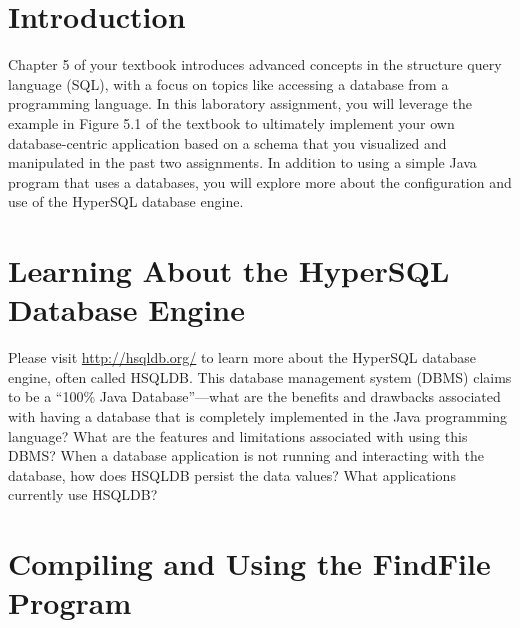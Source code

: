 


\usepackage[compact]{titlesec}



\section*{Introduction}

Chapter 5 of your textbook introduces advanced concepts in the structure query language (SQL), with a focus on topics
like accessing a database from a programming language. In this laboratory assignment, you will leverage the example in
Figure 5.1 of the textbook to ultimately implement your own database-centric application based on a schema that you
visualized and manipulated in the past two assignments. In addition to using a simple Java program that uses a
databases, you will explore more about the configuration and use of the HyperSQL database engine.

\vspace*{-.05in}
\section*{Learning About the HyperSQL Database Engine}

Please visit \url{http://hsqldb.org/} to learn more about the HyperSQL database engine, often called HSQLDB. This
database management system (DBMS) claims to be a ``100\% Java Database''---what are the benefits and drawbacks associated with
having a database that is completely implemented in the Java programming language? What are the features and
limitations associated with using this DBMS? When a database application is not running and interacting with the
database, how does HSQLDB persist the data values? What applications currently use HSQLDB?

\vspace*{-.05in}
\section*{Compiling and Using the FindFile Program}



\vspace*{-.05in}

